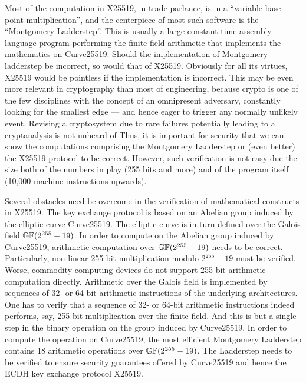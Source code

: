 Most of the computation in X25519, in trade parlance, is in a
``variable base point multiplication'', and the centerpiece of most
such software is the ``Montgomery Ladderstep''. This is usually a
large constant-time assembly language program performing the
finite-field arithmetic that implements the mathematics on Curve25519.
Should the implementation of Montgomery ladderstep be incorrect, so
would that of X25519. Obviously for all its virtues, X25519 would be
pointless if the implementation is incorrect. This may be even more
relevant in cryptography than most of engineering, because crypto is
one of the few disciplines with the concept of an omnipresent
adversary, constantly looking for the smallest edge --- and hence
eager to trigger any normally unlikely event. Revising a cryptosystem
due to rare failures potentially leading to a cryptanalysis is not
unheard of \cite{HowNTRUfail}
Thus, it is important for security that we can show the computations
comprising the Montgomery Ladderstep or (even better) the X25519
protocol to be correct. However, such verification is not easy due
the size both of the numbers in play (255 bits and more) and of the
program itself (10,000 machine instructions upwards).

Several obstacles need be overcome in the verification of mathematical
constructs in X25519. The key exchange protocol is based on an
Abelian group induced by the elliptic curve Curve25519. The elliptic
curve is in turn defined over the Galois field $\mathbb{GF}(2^{255} - 19)$. 
In order to compute on the Abelian group induced by Curve25519,
arithmetic computation over $\mathbb{GF}(2^{255} - 19)$ needs to be
correct. Particularly, non-linear 255-bit multiplication modulo
$2^{255} - 19$ must be verified. Worse, commodity computing devices do
not support 255-bit arithmetic computation directly. Arithmetic over
the Galois field is implemented by sequences of 32- or 64-bit
arithmetic instructions of the underlying architectures. One has to
verify that a sequence of 32- or 64-bit arithmetic instructions indeed
performs, say, 255-bit multiplication over the finite field. And this
is but a single step in the binary operation on the group induced by
Curve25519. In order to compute the operation on Curve25519, 
the most efficient Montgomery Ladderstep contains 18 arithmetic 
operations over $\mathbb{GF}(2^{255} - 19)$. The Ladderstep needs to be
verified to ensure security guarantees offered by Curve25519 and hence 
the ECDH key exchange protocol X25519.

